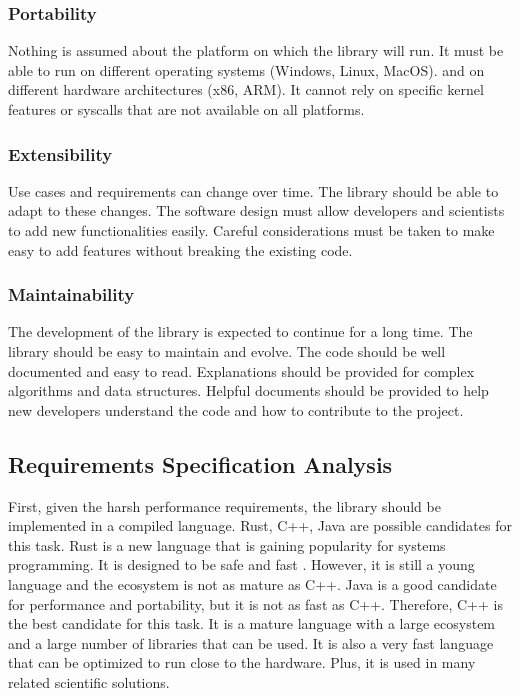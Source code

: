 \begin{spacing}{1.2}
    \subsubsection{Portability}
    Nothing is assumed about the platform on which the library will run. It must be able to run on different operating systems (Windows, Linux, MacOS).
    and on different hardware architectures (x86, ARM). It cannot rely on specific kernel features or syscalls that are not available on all platforms.


    \subsubsection{Extensibility}
    Use cases and requirements can change over time. The library should be able to adapt to these changes.
    The software design must allow developers and scientists to add new functionalities easily.
    Careful considerations must be taken to make easy to add features without breaking the existing code.


    \subsubsection{Maintainability}
    The development of the library is expected to continue for a long time. The library should be easy to maintain and evolve.
    The code should be well documented and easy to read. Explanations should be provided for complex algorithms and data structures.
    Helpful documents should be provided to help new developers understand the code and how to contribute to the project.

    \subsection{Requirements Specification Analysis}
    First, given the harsh performance requirements, the library should be implemented in a compiled language.
    Rust, C++, Java are possible candidates for this task. Rust is a new language that is gaining popularity for systems programming.
    It is designed to be safe and fast \cite{bugden2022rust}. However, it is still a young language and the ecosystem is not as mature as C++.
    Java is a good candidate for performance and portability, but it is not as fast as C++.
    Therefore, C++ is the best candidate for this task. It is a mature language with a large ecosystem and a large number of libraries that can be used.
    It is also a very fast language that can be optimized to run close to the hardware. Plus, it is used in many related scientific solutions.\\


\end{spacing}
